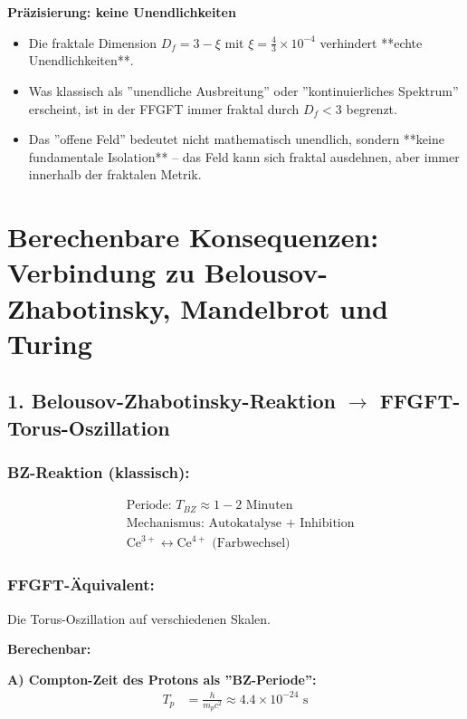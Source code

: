 \textbf{Präzisierung: keine Unendlichkeiten}
\begin{itemize}[label=$\bullet$]
	\item Die fraktale Dimension $D_f = 3 - \xi$ mit $\xi = \frac{4}{3} \times 10^{-4}$ verhindert **echte Unendlichkeiten**.
	\item Was klassisch als ''unendliche Ausbreitung'' oder ''kontinuierliches Spektrum'' erscheint, ist in der FFGFT immer fraktal durch $D_f < 3$ begrenzt.
	\item Das ''offene Feld'' bedeutet nicht mathematisch unendlich, sondern **keine fundamentale Isolation** – das Feld kann sich fraktal ausdehnen, aber immer innerhalb der fraktalen Metrik.
\end{itemize}

\section*{Berechenbare Konsequenzen: Verbindung zu Belousov-Zhabotinsky, Mandelbrot und Turing}

\subsection*{1. Belousov-Zhabotinsky-Reaktion $\rightarrow$ FFGFT-Torus-Oszillation}

\subsubsection*{BZ-Reaktion (klassisch):}
\begin{align*}
	&\text{Periode: } T_{BZ} \approx 1-2 \text{ Minuten} \\
	&\text{Mechanismus: Autokatalyse + Inhibition} \\
	&\text{Ce}^{3+} \longleftrightarrow \text{Ce}^{4+} \text{ (Farbwechsel)}
\end{align*}

\subsubsection*{FFGFT-Äquivalent:}
Die Torus-Oszillation auf verschiedenen Skalen.

\textbf{Berechenbar:}

\textbf{A) Compton-Zeit des Protons als ''BZ-Periode'':}
\begin{align*}
	T_p &= \frac{h}{m_p c^2} \approx 4.4 \times 10^{-24} \text{ s}
\end{align*}

